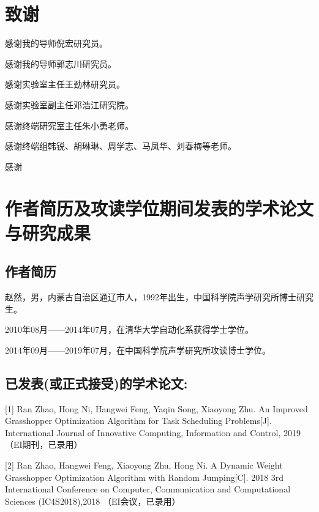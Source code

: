 \chapter[致谢]{致\quad 谢}%
\thispagestyle{noheaderstyle}%


感谢我的导师倪宏研究员。

感谢我的导师郭志川研究员。

感谢实验室主任王劲林研究员。

感谢实验室副主任邓浩江研究院。

感谢终端研究室主任朱小勇老师。

感谢终端组韩锐、胡琳琳、周学志、马凤华、刘春梅等老师。

感谢


\chapter{作者简历及攻读学位期间发表的学术论文与研究成果}


\section*{作者简历}

赵然，男，内蒙古自治区通辽市人，1992年出生，中国科学院声学研究所博士研究生。

2010年08月——2014年07月，在清华大学自动化系获得学士学位。

2014年09月——2019年07月，在中国科学院声学研究所攻读博士学位。


\section*{已发表(或正式接受)的学术论文:}

[1] Ran Zhao, Hong Ni, Hangwei Feng, Yaqin Song, Xiaoyong Zhu. An Improved Grasshopper Optimization Algorithm for Task Scheduling Problems[J]. International Journal of Innovative Computing, Information and Control, 2019（EI期刊，已录用）

[2] Ran Zhao, Hangwei Feng, Xiaoyong Zhu, Hong Ni. A Dynamic Weight Grasshopper Optimization Algorithm with Random Jumping[C]. 2018 3rd International Conference on Computer, Communication and Computational Sciences (IC4S2018),2018 （EI会议，已录用）

